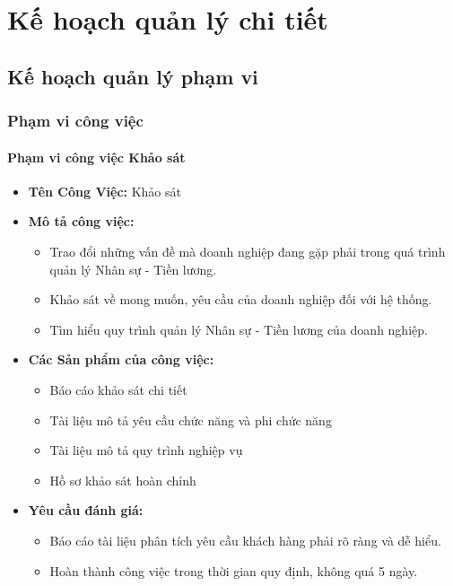 \chapter{Kế hoạch quản lý chi tiết}
\section{Kế hoạch quản lý phạm vi}
\subsection{Phạm vi công việc}
\subsubsection{Phạm vi công việc Khảo sát}
\begin{itemize}
    \item \textbf{Tên Công Việc:} Khảo sát
    \item \textbf{Mô tả công việc:}
          \begin{itemize}
              \item Trao đổi những vấn đề mà doanh nghiệp đang gặp phải trong quá trình quản lý Nhân sự - Tiền lương.
              \item Khảo sát về mong muốn, yêu cầu của doanh nghiệp đối với hệ thống.
              \item Tìm hiểu quy trình quản lý Nhân sự - Tiền lương của doanh nghiệp.
          \end{itemize}
    \item \textbf{Các Sản phẩm của công việc:}
          \begin{itemize}
              \item Báo cáo khảo sát chi tiết
              \item Tài liệu mô tả yêu cầu chức năng và phi chức năng
              \item Tài liệu mô tả quy trình nghiệp vụ
              \item Hồ sơ khảo sát hoàn chỉnh
          \end{itemize}
    \item \textbf{Yêu cầu đánh giá:}
          \begin{itemize}
              \item Báo cáo tài liệu phân tích yêu cầu khách hàng phải rõ ràng và dễ hiểu.
              \item Hoàn thành công việc trong thời gian quy định, không quá 5 ngày.
          \end{itemize}
\end{itemize}
